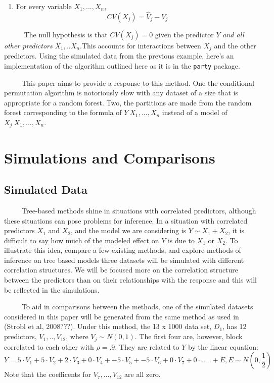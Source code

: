 \documentclass[12pt,twoside]{reedthesis}
\providecommand{\tightlist}{%
  \setlength{\itemsep}{0pt}\setlength{\parskip}{0pt}}
\begin{document}
  \begin{enumerate}
  \def\labelenumi{\arabic{enumi}.}
  \setcounter{enumi}{2}
  \tightlist
  \item
    For every variable \(X_1,..., X_n\), \[CV(X_j) = \hat{V}_j - V_j\]
  \end{enumerate}
  
  ~~~~~ The null hypothesis is that \(CV(X_j) = 0\) given the predictor
  \(Y\) \emph{and all other predictors} \(X_1,..X_n\).This accounts for
  interactions between \(X_j\) and the other predictors. Using the
  simulated data from the previous example, here's an implementation of
  the algorithm outlined here as it is in the \texttt{party} package.
  
  ~~~~~This paper aims to provide a response to this method. One the
  conditional permutation algorithm is notoriously slow with any dataset
  of a size that is appropriate for a random forest. Two, the partitions
  are made from the random forest corresponding to the formula of
  \(Y~X_1,...,X_n\) instead of a model of \(X_j~X_1,...,X_n\).
  
  \chapter{Simulations and Comparisons}\label{simulations-and-comparisons}
  
  \section{Simulated Data}\label{simulated-data}
  
  ~~~~~Tree-based methods shine in situations with correlated predictors,
  although these situations can pose problems for inference. In a
  situation with correlated predictors \(X_1\) and \(X_2\), and the model
  we are considering is \(Y \sim X_1 + X_2\), it is difficult to say how
  much of the modeled effect on \(Y\) is due to \(X_1\) or \(X_2\). To
  illustrate this idea, compare a few existing methods, and explore
  methods of inference on tree based models three datasets will be
  simulated with different correlation structures. We will be focused more
  on the correlation structure between the predictors than on their
  relationships with the response and this will be reflected in the
  simulations.
  
  ~~~~~To aid in comparisons between the methods, one of the simulated
  datasets considered in this paper will be generated from the same method
  as used in (Strobl et al, 2008???). Under this method, the 13 x 1000
  data set, \(D_1\), has 12 predictors, \(V_1,..,V_{12}\), where
  \(V_j \sim N(0,1)\). The first four are, however, block correlated to
  each other with \(\rho = .9\). They are related to \(Y\) by the linear
  equation:
  \[Y = 5 \cdot V_1 + 5 \cdot V_2 + 2 \cdot V_3 + 0 \cdot V_4 + -5 \cdot V_5 + -5\cdot V_6 + 0\cdot V_7 + 0 \cdot ..... + E, E \sim N(0,\frac 1 2 )\]
  Note that the coefficents for \(V_7,...,V_{12}\) are all zero.
  
\end{document}
